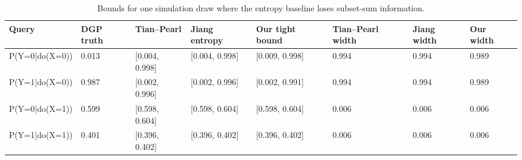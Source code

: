 \begin{table}
\caption{Bounds for one simulation draw where the entropy baseline loses subset-sum information.}
\label{tab:o1-example-bounds}
\begin{tabular}{llllllll}
\toprule
Query & DGP truth & Tian--Pearl & Jiang entropy & Our tight bound & Tian--Pearl width & Jiang width & Our width \\
\midrule
P(Y=0|do(X=0)) & 0.013 & [0.004, 0.998] & [0.004, 0.998] & [0.009, 0.998] & 0.994 & 0.994 & 0.989 \\
P(Y=1|do(X=0)) & 0.987 & [0.002, 0.996] & [0.002, 0.996] & [0.002, 0.991] & 0.994 & 0.994 & 0.989 \\
P(Y=0|do(X=1)) & 0.599 & [0.598, 0.604] & [0.598, 0.604] & [0.598, 0.604] & 0.006 & 0.006 & 0.006 \\
P(Y=1|do(X=1)) & 0.401 & [0.396, 0.402] & [0.396, 0.402] & [0.396, 0.402] & 0.006 & 0.006 & 0.006 \\
\bottomrule
\end{tabular}
\end{table}

